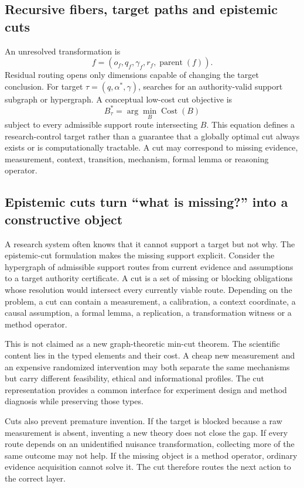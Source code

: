\subsection{Recursive fibers, target paths and epistemic cuts}
An unresolved transformation is
\begin{equation}f=(o_f,q_f,\gamma_f,r_f,\operatorname{parent}(f)).\end{equation}
Residual routing opens only dimensions capable of changing the target conclusion. For target $\tau=(q,\alpha^*,\gamma)$, \RAKL{} searches for an authority-valid support subgraph or hypergraph. A conceptual low-cost cut objective is
\begin{equation}B^*_{\tau}=\arg\min_B\operatorname{Cost}(B)\end{equation}
subject to every admissible support route intersecting $B$. This equation defines a research-control target rather than a guarantee that a globally optimal cut always exists or is computationally tractable. A cut may correspond to missing evidence, measurement, context, transition, mechanism, formal lemma or reasoning operator.

\subsection{Epistemic cuts turn ``what is missing?'' into a constructive object}

A research system often knows that it cannot support a target but not why. The epistemic-cut formulation makes the missing support explicit. Consider the hypergraph of admissible support routes from current evidence and assumptions to a target authority certificate. A cut is a set of missing or blocking obligations whose resolution would intersect every currently viable route. Depending on the problem, a cut can contain a measurement, a calibration, a context coordinate, a causal assumption, a formal lemma, a replication, a transformation witness or a method operator.

This is not claimed as a new graph-theoretic min-cut theorem. The scientific content lies in the typed elements and their cost. A cheap new measurement and an expensive randomized intervention may both separate the same mechanisms but carry different feasibility, ethical and informational profiles. The cut representation provides a common interface for experiment design and method diagnosis while preserving those types.

Cuts also prevent premature invention. If the target is blocked because a raw measurement is absent, inventing a new theory does not close the gap. If every route depends on an unidentified nuisance transformation, collecting more of the same outcome may not help. If the missing object is a method operator, ordinary evidence acquisition cannot solve it. The cut therefore routes the next action to the correct layer.

